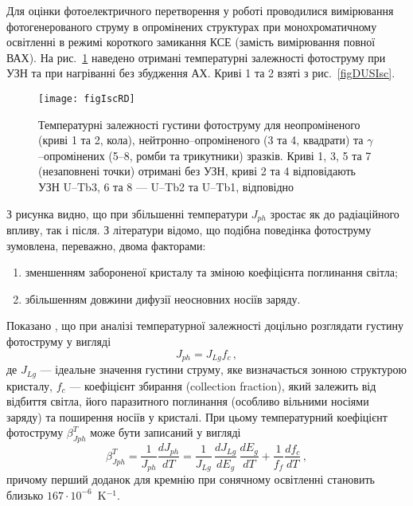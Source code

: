 Для оцінки фотоелектричного перетворення у роботі проводилися вимірювання фотогенерованого струму
в опромінених структурах
при монохроматичному освітленні в режимі короткого замикання КСЕ (замість вимірювання повної ВАХ).
На рис.~\ref{figIscRD} наведено отримані температурні залежності фотоструму
при УЗН та при нагріванні без збудження АХ.
Криві 1 та 2 взяті з рис.~\ref{figDUSIsc}.




\begin{figure}[b]
\center
\texttt{[image: figIscRD]}
\caption{\label{figIscRD}
Температурні залежності густини фотоструму
для неопроміненого (криві 1 та 2, кола),
нейтронно--опроміненого (3 та 4, квадрати) та
$\gamma$--опромінених (5--8, ромби та трикутники)
зразків.
Криві 1, 3, 5 та 7 (незаповнені точки) отримані без УЗН,
криві 2 та 4 відповідають УЗН U--Tb3,
6 та 8 ---
U--Tb2 та U--Tb1, відповідно
}%
\end{figure}

З рисунка видно, що при збільшенні температури $J_{ph}$ зростає як до радіаційного впливу, так і після.
З літератури \cite{Faren,SCTemp:PP11,SCTemp:SEMSC140} відомо, що
подібна поведінка фотоструму зумовлена, переважно, двома факторами:
\begin{enumerate}[label=\arabic*),leftmargin=0em,itemindent=1.5em]
\item зменшенням забороненої кристалу та зміною коефіцієнта поглинання світла;
\item збільшенням довжини дифузії неосновних носіїв заряду.
\end{enumerate}
Показано \cite{SCTemp:PP11,SCTemp:SEMSC140}, що при аналізі температурної залежності доцільно
розглядати густину фотоструму у вигляді
\begin{equation}
\label{eqIscIdeal}
J_{ph}=J_{Lg}f_c\,,
\end{equation}
де
$J_{Lg}$ --- ідеальне значення густини струму, яке визначається
зонною структурою кристалу,
$f_c$ --- коефіцієнт збирання (collection fraction),
який залежить від відбиття світла, його паразитного поглинання (особливо вільними носіями заряду)
та поширення носіїв у кристалі.
При цьому температурний коефіцієнт фотоструму $\beta^T_{Jph}$ може бути записаний у вигляді
\begin{equation}
\label{eqIscTempKoef}
\beta^T_{Jph}=\frac{1}{J_{ph}}\frac{dJ_{ph}}{dT}=\frac{1}{J_{Lg}}\,\frac{dJ_{Lg}}{dE_g}\,\frac{dE_g}{dT}+\frac{1}{f_{f}}\frac{df_{c}}{dT}\,,
\end{equation}
причому перший доданок для кремнію при сонячному освітленні становить близько $167\cdot10^{-6}$~K$^{-1}$.



